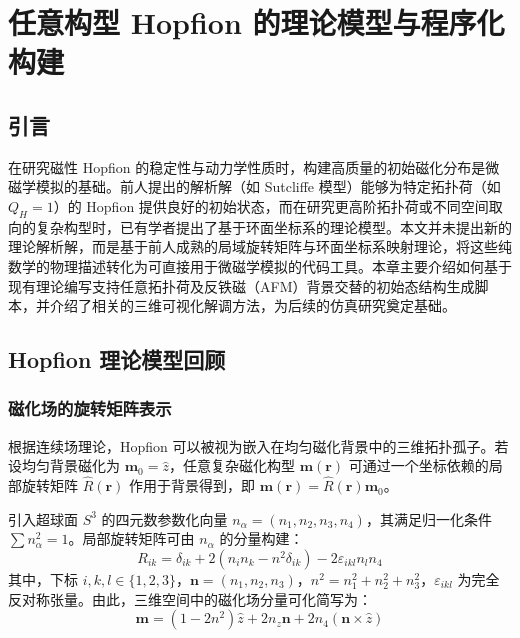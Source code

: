 \chapter{任意构型 Hopfion 的理论模型与程序化构建}

\section{引言}

在研究磁性 Hopfion 的稳定性与动力学性质时，构建高质量的初始磁化分布是微磁学模拟的基础。前人提出的解析解（如 Sutcliffe 模型）能够为特定拓扑荷（如 $Q_H=1$）的 Hopfion 提供良好的初始状态，而在研究更高阶拓扑荷或不同空间取向的复杂构型时，已有学者提出了基于环面坐标系的理论模型\cite{guslienko2025magnetic}。本文并未提出新的理论解析解，而是基于前人成熟的局域旋转矩阵与环面坐标系映射理论，将这些纯数学的物理描述转化为可直接用于微磁学模拟的代码工具。本章主要介绍如何基于现有理论编写支持任意拓扑荷及反铁磁（AFM）背景交替的初始态结构生成脚本，并介绍了相关的三维可视化解调方法，为后续的仿真研究奠定基础。

\section{Hopfion 理论模型回顾}

\subsection{磁化场的旋转矩阵表示}
根据连续场理论，Hopfion 可以被视为嵌入在均匀磁化背景中的三维拓扑孤子。若设均匀背景磁化为 $\mathbf{m}_0 = \hat{z}$，任意复杂磁化构型 $\mathbf{m}(\mathbf{r})$ 可通过一个坐标依赖的局部旋转矩阵 $\hat{R}(\mathbf{r})$ 作用于背景得到，即 $\mathbf{m}(\mathbf{r}) = \hat{R}(\mathbf{r}) \mathbf{m}_0$。

引入超球面 $S^3$ 的四元数参数化向量 $n_\alpha = (n_1, n_2, n_3, n_4)$，其满足归一化条件 $\sum n_\alpha^2 = 1$。局部旋转矩阵可由 $n_\alpha$ 的分量构建：
\begin{equation}
    R_{ik} = \delta_{ik} + 2(n_i n_k - n^2 \delta_{ik}) - 2\varepsilon_{ikl} n_l n_4
\end{equation}
其中，下标 $i, k, l \in \{1,2,3\}$，$\mathbf{n} = (n_1, n_2, n_3)$，$n^2 = n_1^2 + n_2^2 + n_3^2$，$\varepsilon_{ikl}$ 为完全反对称张量。由此，三维空间中的磁化场分量可化简写为：
\begin{equation}
    \mathbf{m} = (1 - 2n^2)\hat{z} + 2n_z \mathbf{n} + 2n_4(\mathbf{n} \times \hat{z})
    \label{eq:hopf_magnetization}
\end{equation}

